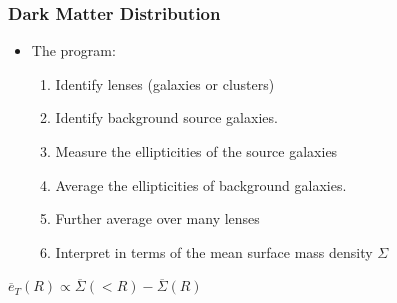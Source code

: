 \documentclass{beamer}
\begin{document}
\frame
{
    \frametitle{Dark Matter Distribution}


    \begin{itemize}

        \item The program:
            \begin{enumerate}

                \item Identify lenses (galaxies or clusters)

                \item Identify background source galaxies.

                \item Measure the ellipticities of the source galaxies

                \item Average the ellipticities of background galaxies.

                \item Further average over many lenses

                \item Interpret in terms of the mean surface mass density {\color{gold}
                    $\Sigma$}

            \end{enumerate}
    \end{itemize}

    \begin{center}
        {\color{gold}
            {\huge
                $\overline{e}_{T}(R) \propto \overline{\Sigma}(<R) - \overline{\Sigma}(R)$
            }
        }
    \end{center}
}
\end{document}

